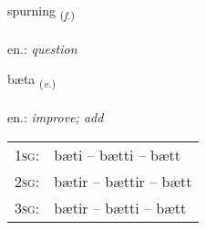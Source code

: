 \documentclass[frontgrid, backgrid]{flacards}\usepackage[]{graphicx}\usepackage[]{xcolor}
\begin{document}
\renewcommand{\flhead}{\vskip5pt \fboxsep=0pt {\small\bfseries\footnotesize Nafnorð | Noun}}
\renewcommand{\fcfoot}{\vskip5pt \fboxsep=0pt \hspace{2pt}{\small\bfseries\footnotesize 1K}}

\renewcommand{\blhead}{\vskip5pt {\small\bfseries\footnotesize Nafnorð | Noun }}
\renewcommand{\bcfoot}{\vskip5pt \hspace{2pt}{\small\bfseries\footnotesize 1K}}


{spurning \small{\textsubscript{(\textit{f.})}} \\[1ex] %
\textphonetic{[spʏrtniŋk]} \\
en.: \emph{question} \\  [2ex]
\renewcommand*{\arraystretch}{0.8}
}

\renewcommand{\flhead}{\vskip5pt \fboxsep=0pt {\small\bfseries\footnotesize Sagnorð | Verb}}
\renewcommand{\fcfoot}{\vskip5pt \fboxsep=0pt \hspace{2pt}{\small\bfseries\footnotesize 1K}}

\renewcommand{\blhead}{\vskip5pt {\small\bfseries\footnotesize Sagnorð | Verb }}
\renewcommand{\bcfoot}{\vskip5pt \hspace{2pt}{\small\bfseries\footnotesize 1K}}


{bæta \small{\textsubscript{(\textit{v.})}} \\[1ex] %
\textphonetic{[paiːta]} \\
en.: \emph{improve; add} \\  [2ex]
\renewcommand*{\arraystretch}{0.8}
\begin{tabular}{p{1cm}l}
\textsc{1sg}: & bæti -- bætti -- bætt \\ 
\textsc{2sg}: & bætir -- bættir -- bætt \\ 
\textsc{3sg}: & bætir -- bætti -- bætt \\ 
\end{tabular}
}
\end{document}
